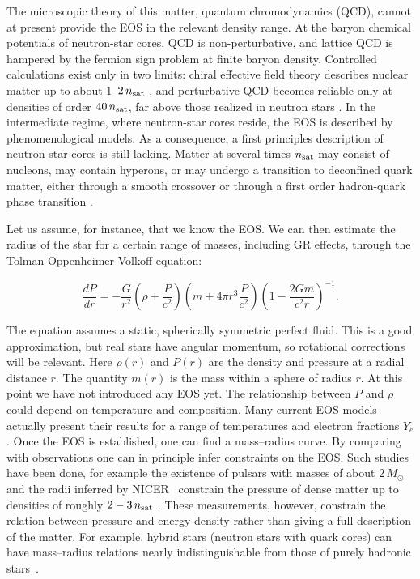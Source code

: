 The microscopic theory of this matter, quantum chromodynamics (QCD), cannot at present provide the EOS in the relevant density range.
At the baryon chemical potentials of neutron-star cores, QCD is non-perturbative, and lattice QCD is hampered by the fermion sign problem at finite baryon density. 
Controlled calculations exist only in two limits: chiral effective field theory describes nuclear matter up to about $1$--$2\,n_{\rm sat}$ \cite{hebeler_equation_2013}, and perturbative QCD becomes reliable only at densities of order $40\,n_{\rm sat}$, far above those realized in neutron stars \cite{kurkela_constraining_2014}.
In the intermediate regime, where neutron-star cores reside, the EOS is described by phenomenological models.
As a consequence, a first principles description of neutron star cores is still lacking.
Matter at several times $n_{\rm sat}$ may consist of nucleons, may contain hyperons, or may undergo a transition to deconfined quark matter, either through a smooth crossover or through a first order hadron-quark phase transition \cite{baym_hadrons_2018}.

Let us assume, for instance, that we know the EOS.
We can then estimate the radius of the star for a certain range of masses, including GR effects, through the Tolman-Oppenheimer-Volkoff equation:

\begin{equation}
  \frac{dP}{dr} = -\frac{G}{r^2}\left ( \rho + \frac{P}{c^2}\right )\left ( m + 4\pi r^3 \frac{P}{c^2} \right )\left ( 1- \frac{2Gm}{c^2 r} \right )^{-1}.
\end{equation}

The equation assumes a static, spherically symmetric perfect fluid.
This is a good approximation, but real stars have angular momentum, so rotational corrections will be relevant. 
Here $\rho (r)$ and $P(r)$ are the density and pressure at a radial distance $r$. 
The quantity $m(r)$ is the mass within a sphere of radius $r$.
At this point we have not introduced any EOS yet.
The relationship between $P$ and $\rho$ could depend on temperature and composition.
Many current EOS models actually present their results for a range of temperatures and electron fractions $Y_e$.
Once the EOS is established, one can find a mass--radius curve. 
By comparing with observations one can in principle infer constraints on the EOS.
Such studies have been done, for example the existence of pulsars with masses of about $2\, M_\odot$~\cite{fonseca_refined_2021} and the radii inferred by NICER~\cite{riley_nicer_2021} constrain the pressure of dense matter up to densities of roughly $2-3\,n_{\rm sat}$ \cite{raaijmakers_constraints_2021}.
These measurements, however, constrain the relation between pressure and energy density rather than giving a full description of the matter. 
For example, hybrid stars (neutron stars with quark cores) can have mass--radius relations nearly indistinguishable from those of purely hadronic stars~\cite{alford_hybrid_2005}.

